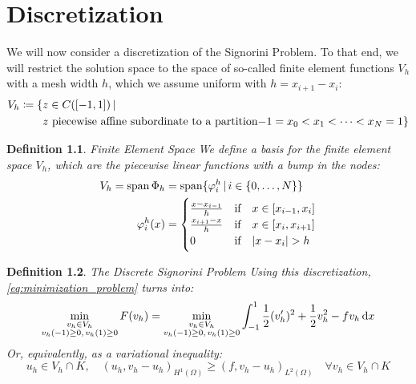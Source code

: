 \documentclass[headsepline,footsepline,footinclude=false,oneside,fontsize=11pt,paper=a4,listof=totoc,bibliography=totoc]{scrbook} %
\newtheorem{definition}{Definition}
\begin{document}
\chapter{Discretization}
We will now consider a discretization of the Signorini Problem. To that end, we will restrict the solution space to the space of so-called finite element functions $V_h$ with a mesh width $h$, which we assume uniform with $h = x_{i+1} - x_i$:
\begin{align}
V_h \coloneqq \{&z \in C([-1,1]) \, | \, \\ 
	&z \,\, \text{piecewise affine subordinate to a partition} \mathmbox{-1}=x_0<x_1<\dots<x_N = 1 \} \nonumber
\end{align} 

\begin{definition} Finite Element Space
We define a basis for the finite element space $V_h$, which are the piecewise linear functions with a bump in the nodes:
\begin{align} \label{eq:basis_finite_element_space}
\begin{split}
V_h = \mathrm{span}\,\Phi_h &= \mathrm{span}\{\varphi_i^h \,|\, i \in \{0,\dots,N\}\} \\
\varphi_i^h (x) &= \begin{cases}
\frac{x-x_{i-1}}{h} & \text{if} \quad x\in [x_{i-1},x_i] \\
\frac{x_{i+1}-x}{h} & \text{if} \quad  x\in [x_i,x_{i+1}] \\
0 & \text{if} \quad  \abs{x-x_i} > h
\end{cases}
\end{split}
\end{align}
\end{definition}

\begin{definition} The Discrete Signorini Problem \newline
	Using this discretization, \eqref{eq:minimization_problem} turns into:
	\begin{equation} \label{eq:discrete_minimization}
	\min_{\substack{v_h \in V_h \\ v_h(-1) \geq 0,\, v_h(1) \geq 0}} F(v_h) = \min_{\substack{v_h \in V_h \\ v_h(-1) \geq 0,\, v_h(1) \geq 0}} \int_{-1}^1{\frac{1}{2} (v_h')^2 + \frac{1}{2} v_h^2 - fv_h \dif x} 
	\end{equation}
	Or, equivalently, as a variational inequality:
	\begin{equation}\label{eq:discrete_variational_inequality}
	u_h \in V_h \cap K,\quad (u_h, v_h-u_h)_{H^1(\Omega)} \geq (f, v_h - u_h)_{L^2(\Omega)} \quad \forall v_h \in V_h \cap K
	\end{equation}
	
\end{definition}
\end{document}
